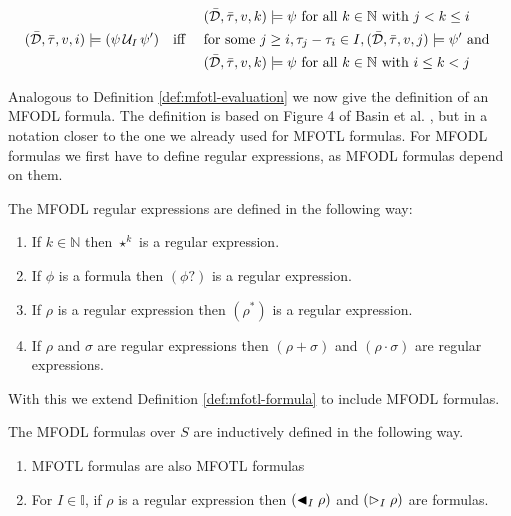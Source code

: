 \begin{definition}
\begin{alignat*}{3}
            &&&&&(\bar{\mathcal{D}}, \bar{\tau}, v, k) \models \psi \text{ for all } k \in \mathbb{N} \text{ with } j < k \leq i \\
        &(\bar{\mathcal{D}},\bar{\tau},v,i) \models (\psi \,\mathcal{U}_{I}\, \psi')
            &&\text{iff } && \text{for some } j \geq i, \tau_j - \tau_i \in I, (\bar{\mathcal{D}}, \bar{\tau}, v, j) \models \psi' \text{ and } \\
            &&&&&(\bar{\mathcal{D}}, \bar{\tau}, v, k) \models \psi \text{ for all } k \in \mathbb{N} \text{ with } i \leq k < j \\
    \end{alignat*}
\end{definition}

Analogous to Definition \ref{def:mfotl-evaluation} we now give the definition of an MFODL formula.
The definition is based on Figure 4 of Basin et al. \cite{Basin2020}, but in a notation closer to the one we already used for MFOTL formulas.
For MFODL formulas we first have to define regular expressions, as MFODL formulas depend on them.
\renewcommand{\labelenumi}{(\roman{enumi})}
\begin{definition}
    \label{def:mfodl-formula}
    The MFODL regular expressions are defined in the following way:
    \begin{enumerate}
        \item If $k \in \mathbb{N}$ then $\star^k$ is a regular expression.
        \item If $\phi$ is a formula then $(\phi ?)$ is a regular expression.
        \item If $\rho$ is a regular expression then $(\rho^*)$ is a regular expression.
        \item If $\rho$ and $\sigma$ are regular expressions then $(\rho + \sigma)$ and $(\rho \cdot \sigma)$ are regular expressions.
    \end{enumerate}
\end{definition}
With this we extend Definition \ref{def:mfotl-formula} to include MFODL formulas.
\begin{definition}
    The MFODL formulas over $S$ are inductively defined in the following way.
    \label{def:regex}
    \begin{enumerate}
        \item MFOTL formulas are also MFOTL formulas
        \item For $I \in \mathbb{I}$, if $\rho$ is a regular expression then $(\blacktriangleleft_{I} \rho)$ and $(\vartriangleright_{I} \rho)$ are formulas.
    \end{enumerate}
\end{definition}

